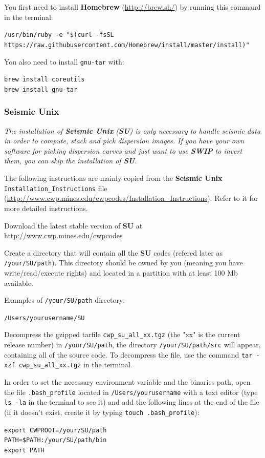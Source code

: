 \documentclass[twoside,a4paper]{article}
\def\SWIP{\textbf{SWIP}}
\def\SU{\textbf{SU}}
\def\SeismicUnix{\textbf{Seismic Unix}}
\begin{document}
You first need to install \textbf{Homebrew} (\url{http://brew.sh/}) by running this command in the terminal:

\verb|/usr/bin/ruby -e "$(curl -fsSL https://raw.githubusercontent.com/Homebrew/install/master/install)"|

You also need to install \verb|gnu-tar| with:

\verb|brew install coreutils|\\
\verb|brew install gnu-tar|

\subsubsection{Seismic Unix}
\textit{The installation of {\SeismicUnix} ({\SU}) is only necessary to handle seismic data in order to compute, stack and pick dispersion images. If you have your own software for picking dispersion curves and just want to use {\SWIP} to invert them, you can skip the installation of {\SU}.}

The following instructions are mainly copied from the {\SeismicUnix} \verb|Installation_Instructions| file (\url{http://www.cwp.mines.edu/cwpcodes/Installation_Instructions}). Refer to it for more detailed instructions.

Download the latest stable version of {\SU} at \url{http://www.cwp.mines.edu/cwpcodes}

Create a directory that will contain all the {\SU} codes (refered later as \verb|/your/SU/path|). This directory should be owned by you (meaning you have write/read/execute rights) and located in a partition with at least 100 Mb available.

Examples of \verb|/your/SU/path| directory:

\verb|/Users/yourusername/SU|

Decompress the gzipped tarfile \verb|cwp_su_all_xx.tgz| (the "xx" is the current release number) in \verb|/your/SU/path|, the directory \verb|/your/SU/path/src| will appear, containing all of the source code. To decompress the file, use the command \verb|tar -xzf cwp_su_all_xx.tgz| in the terminal.

In order to set the necessary environment variable and the binaries path, open the file \verb|.bash_profile| located in \verb|/Users/yourusername| with a text editor (type \verb|ls -la| in the terminal to see it) and add the following lines at the end of the file (if it doesn't exist, create it by typing \verb|touch .bash_profile|):

\verb|export CWPROOT=/your/SU/path|\\
\verb|PATH=$PATH:/your/SU/path/bin|\\
\verb|export PATH|
\end{document}
